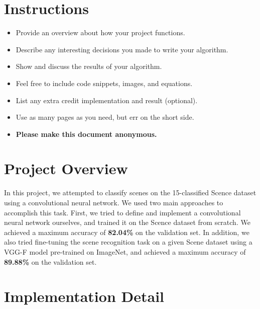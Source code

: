 \section*{Instructions}
\begin{itemize}
  \item Provide an overview about how your project functions. 
  \item Describe any interesting decisions you made to write your algorithm.
  \item Show and discuss the results of your algorithm.
  \item Feel free to include code snippets, images, and equations.
  \item List any extra credit implementation and result (optional).
  \item Use as many pages as you need, but err on the short side.
  \item \textbf{Please make this document anonymous.}
\end{itemize}

\section*{Project Overview}

In this project, we attempted to classify scenes on the 15-classified Scence dataset using a convolutional neural network. We used two main approaches to accomplish this task. First, we tried to define and implement a convolutional neural network ourselves, and trained it on the Scence dataset from scratch. We achieved a maximum accuracy of \textbf{82.04\%} on the validation set. In addition, we also tried fine-tuning the scene recognition task on a given Scene dataset using a VGG-F model pre-trained on ImageNet, and achieved a maximum accuracy of \textbf{89.88\%} on the validation set. 

\section*{Implementation Detail}

